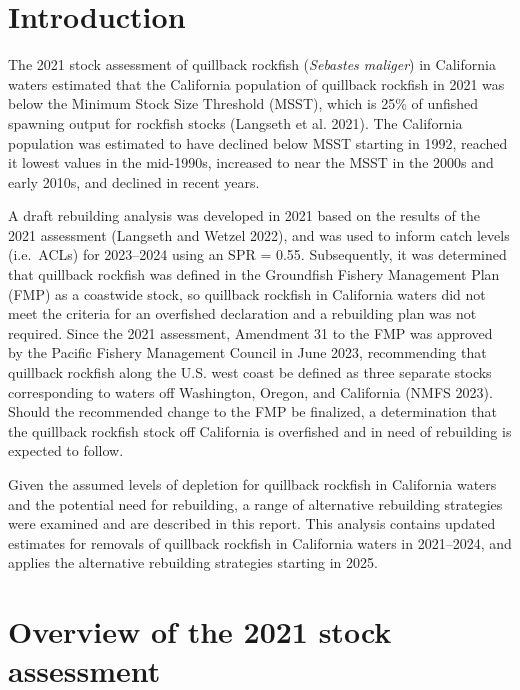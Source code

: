 \documentclass[11pt,
  letterpaper,
]{article}
\begin{document}
\pagebreak
\setlength{\parskip}{3mm plus1mm minus1mm}
\setcounter{page}{1}
\renewcommand{\thefigure}{\arabic{figure}}
\renewcommand{\thetable}{\arabic{table}}
\setcounter{table}{0}
\setcounter{figure}{0}

\hypertarget{introduction}{%
\section{Introduction}\label{introduction}}

The 2021 stock assessment of quillback rockfish (\emph{Sebastes maliger}) in California waters estimated that the California population of quillback rockfish in 2021 was below the Minimum Stock Size Threshold (MSST), which is 25\(\%\) of unfished spawning output for rockfish stocks (Langseth et al. 2021). The California population was estimated to have declined below MSST starting in 1992, reached it lowest values in the mid-1990s, increased to near the MSST in the 2000s and early 2010s, and declined in recent years.

A draft rebuilding analysis was developed in 2021 based on the results of the 2021 assessment (Langseth and Wetzel 2022), and was used to inform catch levels (i.e.~ACLs) for 2023--2024 using an SPR = 0.55. Subsequently, it was determined that quillback rockfish was defined in the Groundfish Fishery Management Plan (FMP) as a coastwide stock, so quillback rockfish in California waters did not meet the criteria for an overfished declaration and a rebuilding plan was not required. Since the 2021 assessment, Amendment 31 to the FMP was approved by the Pacific Fishery Management Council in June 2023, recommending that quillback rockfish along the U.S. west coast be defined as three separate stocks corresponding to waters off Washington, Oregon, and California (NMFS 2023). Should the recommended change to the FMP be finalized, a determination that the quillback rockfish stock off California is overfished and in need of rebuilding is expected to follow.

Given the assumed levels of depletion for quillback rockfish in California waters and the potential need for rebuilding, a range of alternative rebuilding strategies were examined and are described in this report. This analysis contains updated estimates for removals of quillback rockfish in California waters in 2021--2024, and applies the alternative rebuilding strategies starting in 2025.

\hypertarget{overview-of-the-2021-stock-assessment}{%
\section{Overview of the 2021 stock assessment}\label{overview-of-the-2021-stock-assessment}}
\end{document}

